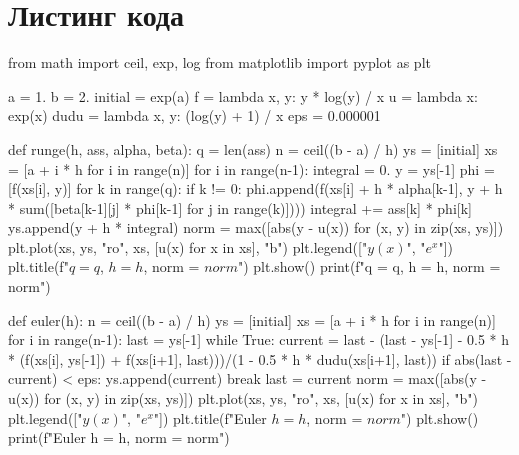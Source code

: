 \documentclass{article}
\begin{document}
\section*{Листинг кода}
\begin{python}
from math import ceil, exp, log
from matplotlib import pyplot as plt

a = 1.
b = 2.
initial = exp(a)
f = lambda x, y: y * log(y) / x
u = lambda x: exp(x)
dudu = lambda x, y: (log(y) + 1) / x
eps = 0.000001

def runge(h, ass, alpha, beta):
    q = len(ass)
    n = ceil((b - a) / h)
    ys = [initial]
    xs = [a + i * h for i in range(n)]
    for i in range(n-1):
        integral = 0.
        y = ys[-1]
        phi = [f(xs[i], y)]
        for k in range(q):
            if k != 0:
                phi.append(f(xs[i] + h * alpha[k-1], y + h * sum([beta[k-1][j] * phi[k-1] for j in range(k)])))
            integral += ass[k] * phi[k]
        ys.append(y + h * integral)
    norm = max([abs(y - u(x)) for (x, y) in zip(xs, ys)])
    plt.plot(xs, ys, "ro", xs, [u(x) for x in xs], "b")
    plt.legend(["$y(x)$", "$e^x$"])
    plt.title(f"$q = {q}$, $h = {h}$, norm = ${norm}$")
    plt.show()
    print(f"q = {q}, h = {h}, norm = {norm}")

def euler(h):
    n = ceil((b - a) / h)
    ys = [initial]
    xs = [a + i * h for i in range(n)]
    for i in range(n-1): 
        last = ys[-1]
        while True:
            current = last - (last - ys[-1] - 0.5 * h * (f(xs[i], ys[-1]) + f(xs[i+1], last)))/(1 - 0.5 * h * dudu(xs[i+1], last))
            if abs(last - current) < eps:
                ys.append(current)
                break
            last = current
    norm = max([abs(y - u(x)) for (x, y) in zip(xs, ys)])
    plt.plot(xs, ys, "ro", xs, [u(x) for x in xs], "b")
    plt.legend(["$y(x)$", "$e^x$"])
    plt.title(f"Euler $h = {h}$, norm = ${norm}$")
    plt.show()
    print(f"Euler h = {h}, norm = {norm}")
\end{python}
\end{document}
